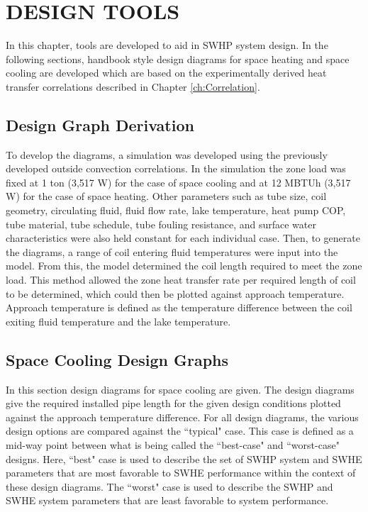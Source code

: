
\chapter{DESIGN TOOLS}
\label{ch:SWHEModel}

In this chapter, tools are developed to aid in SWHP system design. In the following sections, handbook style design diagrams for space heating and space cooling are developed which are based on the experimentally derived heat transfer correlations described in Chapter \ref{ch:Correlation}.

\section{Design Graph Derivation}
\label{sec:DesignTools:Derivation}

To develop the diagrams, a simulation was developed using the previously developed outside convection correlations. In the simulation the zone load was fixed at 1 ton (3,517 W) for the case of space cooling and at 12 MBTUh (3,517 W) for the case of space heating. Other parameters such as tube size, coil geometry, circulating fluid, fluid flow rate, lake temperature, heat pump COP, tube material, tube schedule, tube fouling resistance, and surface water characteristics were also held constant for each individual case. Then, to generate the diagrams, a range of coil entering fluid temperatures were input into the model. From this, the model determined the coil length required to meet the zone load. This method allowed the zone heat transfer rate per required length of coil to be determined, which could then be plotted against approach temperature. Approach temperature is defined as the temperature difference between the coil exiting fluid temperature and the lake temperature.

\section{Space Cooling Design Graphs}
\label{sec:DesignTools:SpcCooling}

In this section design diagrams for space cooling are given.  The design diagrams give the required installed pipe length for the given design conditions plotted against the approach temperature difference. For all design diagrams, the various design options are compared against the ``typical" case. This case is defined as a mid-way point between what is being called the ``best-case" and ``worst-case" designs. Here, ``best" case is used to describe the set of SWHP system and SWHE parameters that are most favorable to SWHE performance within the context of these design diagrams. The ``worst" case is used to describe the SWHP and SWHE system parameters that are least favorable to system performance. 


